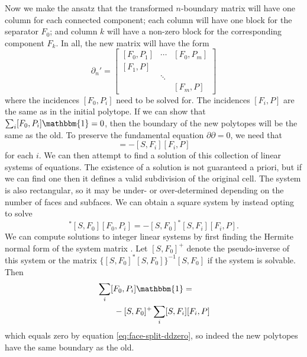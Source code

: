 \documentclass[twocolumn]{article}
\begin{document}
Now we make the ansatz that the transformed $n$-boundary matrix will have one column for each connected component; each column will have one block for the separator $F_0$; and column $k$ will have a non-zero block for the corresponding component $F_k$.
In all, the new matrix will have the form
\begin{equation}
    \partial_n' = \left[\begin{matrix}[F_0, P_1] & \cdots & [F_0, P_m] \\ [F_1, P] & & \\ & \ddots & \\ & & [F_m, P]\end{matrix}\right]
\end{equation}
where the incidences $[F_0, P_i]$ need to be solved for.
The incidences $[F_i, P]$ are the same as in the initial polytope.
If we can show that $\sum_i[F_0, P_i]\mathbbm{1} = 0$, then the boundary of the new polytopes will be the same as the old.
To preserve the fundamental equation $\partial\partial = 0$, we need that
\begin{equation}
    [S, F_0][F_0, P_i] = -[S, F_i][F_i, P]
\end{equation}
for each $i$.
We can then attempt to find a solution of this collection of linear systems of equations.
The existence of a solution is not guaranteed a priori, but if we can find one then it defines a valid subdivision of the original cell.
The system is also rectangular, so it may be under- or over-determined depending on the number of faces and subfaces.
We can obtain a square system by instead opting to solve
\begin{equation}
    [S, F_0]^*[S, F_0][F_0, P_i] = -[S, F_0]^*[S, F_i][F_i, P].
    \label{eq:face-split-normal-eqn}
\end{equation}
We can compute solutions to integer linear systems by first finding the Hermite normal form of the system matrix \cite{kannan1979polynomial}.
Let $[S, F_0]^+$ denote the pseudo-inverse of this system or the matrix $\{[S, F_0]^*[S, F_0]\}^{-1}[S, F_0]$ if the system is solvable.
Then
\begin{align}
    & \sum_i[F_0, P_i]\mathbbm{1} = \nonumber\\
    & \quad\quad -[S, F_0]^+\sum_i[S, F_i][F_i, P]
\end{align}
which equals zero by equation \eqref{eq:face-split-ddzero}, so indeed the new polytopes have the same boundary as the old.
\end{document}
